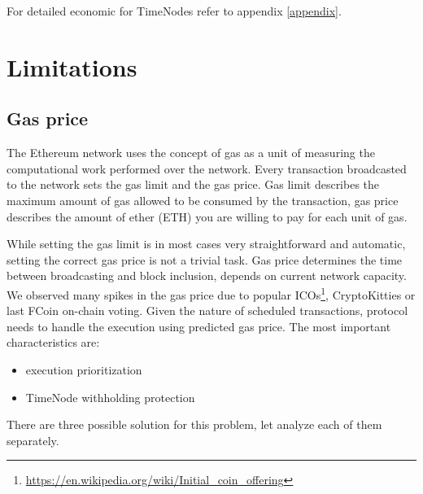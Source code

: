 \documentclass{report}
\begin{document}
  For detailed economic for TimeNodes refer to appendix \ref{appendix}.
  \section{Limitations}
  \subsection{Gas price}
  The Ethereum network uses the concept of gas as a unit of measuring the computational work performed over the network. Every transaction broadcasted to the network sets the gas limit and the gas price. Gas limit describes the maximum amount of gas allowed to be consumed by the transaction, gas price describes the amount of ether (ETH) you are willing to pay for each unit of gas.

  While setting the gas limit is in most cases very straightforward and automatic, setting the correct gas price is not a trivial task. Gas price determines the time between broadcasting and block inclusion, depends on current network capacity. We observed many spikes in the gas price due to popular ICOs\footnote{\url{https://en.wikipedia.org/wiki/Initial_coin_offering}}, CryptoKitties or last FCoin on-chain voting.
Given the nature of scheduled transactions, protocol needs to handle the execution using predicted gas price. The most important characteristics are:
  \begin{itemize}
    \item execution prioritization
    \item TimeNode withholding protection
  \end{itemize}

  There are three possible solution for this problem, let analyze each of them separately.
\end{document}
